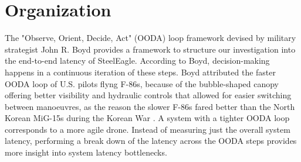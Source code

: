 \section{Organization}
The "Observe, Orient, Decide, Act" (OODA) loop framework devised by military
strategist John R. Boyd provides a framework to structure our investigation
into the end-to-end latency of SteelEagle. According to Boyd, decision-making
happens in a continuous iteration of these steps. Boyd attributed the faster
OODA loop of U.S. pilots flyng F-86s, because of the bubble-shaped canopy
offering better visibility and hydraulic controls that allowed for easier
switching between manoeuvres, as the reason the slower F-86s fared better than
the North Korean MiG-15s during the Korean War \cite{morton1995}. A system with
a tighter OODA loop corresponds to a more agile drone. Instead of measuring
just the overall system latency, performing a break down of the latency across
the OODA steps provides more insight into system latency bottlenecks.

